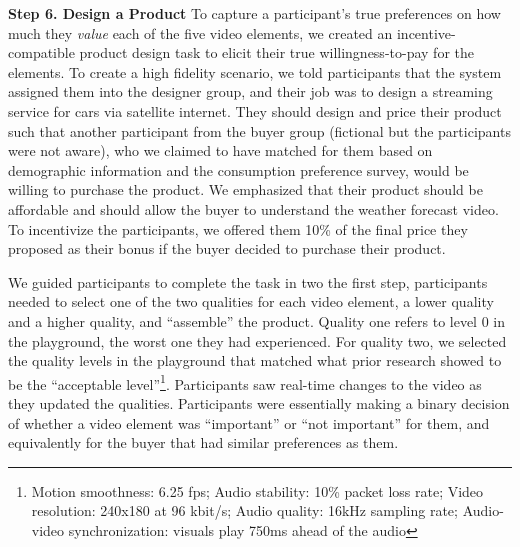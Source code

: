 {}

\textbf{Step 6. Design a Product} To capture a participant's true preferences on how much they \textit{value} each of the five video elements, we created an incentive-compatible product design task to elicit their true willingness-to-pay for the elements. To create a high fidelity scenario, we told participants that the system assigned them into the designer group, and their job was to design a streaming service for cars via satellite internet. They should design and price their product such that another participant from the buyer group (fictional but the participants were not aware), who we claimed to have matched for them based on demographic information and the consumption preference survey, would be willing to purchase the product. We emphasized that their product should be affordable and should allow the buyer to understand the weather forecast video. To incentivize the participants, we offered them 10\% of the final price they proposed as their bonus if the buyer decided to purchase their product.

We guided participants to complete the task in two {} the first step, participants needed to select one of the two qualities for each video element, a lower quality and a higher quality, and ``assemble'' the product. Quality one refers to level 0 in the playground, the worst one they had experienced. For quality two, we selected the quality levels in the playground that matched what prior research showed to be the ``acceptable level''\footnote{Motion smoothness: 6.25 fps; Audio stability: 10\% packet loss rate; Video resolution: 240x180 at 96 kbit/s; Audio quality: 16kHz sampling rate; Audio-video synchronization: visuals play 750ms ahead of the audio}. Participants saw real-time changes to the video as they updated the qualities. Participants were essentially making a binary decision of whether a video element was ``important'' or ``not important'' for them, and equivalently for the buyer that had similar preferences as them. 

